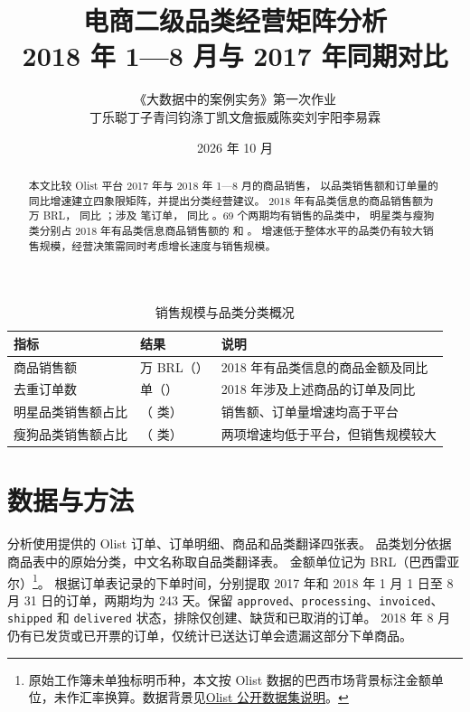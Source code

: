 \documentclass[11pt,a4paper]{ctexart}
\title{\bfseries 电商二级品类经营矩阵分析\\[0.3em]
\large 2018 年 1—8 月与 2017 年同期对比}
\author{《大数据中的案例实务》第一次作业\\[0.35em]
\small 丁乐聪\quad 丁子青\quad 闫钧涤\quad 丁凯文\quad 詹振威\quad 陈奕\quad 刘宇阳\quad 李易霖}
\date{2026 年 10 月}
\begin{document}
\pagestyle{plain}
\maketitle

\begin{abstract}
本文比较 Olist 平台 2017 年与 2018 年 1—8 月的商品销售，
以品类销售额和订单量的同比增速建立四象限矩阵，并提出分类经营建议。
2018 年有品类信息的商品销售额为 \SalesEighteen{} 万 BRL，
同比 \SalesGrowth{}；涉及 \OrdersEighteen{} 笔订单，
同比 \OrderGrowth{}。69 个两期均有销售的品类中，
明星类与瘦狗类分别占 2018 年有品类信息商品销售额的 \StarShare{} 和 \DogShare{}。
增速低于整体水平的品类仍有较大销售规模，经营决策需同时考虑增长速度与销售规模。
\end{abstract}

\begin{table}[H]
\centering
\caption{销售规模与品类分类概况}
\begin{tabular}{p{4.0cm}p{4.5cm}p{6.2cm}}
\toprule
指标 & 结果 & 说明 \\
\midrule
商品销售额 & \SalesEighteen{} 万 BRL（\SalesGrowth{}） & 2018 年有品类信息的商品金额及同比 \\
去重订单数 & \OrdersEighteen{} 单（\OrderGrowth{}） & 2018 年涉及上述商品的订单及同比 \\
明星品类销售额占比 & \StarShare{}（\StarCount{} 类） & 销售额、订单量增速均高于平台 \\
瘦狗品类销售额占比 & \DogShare{}（\DogCount{} 类） & 两项增速均低于平台，但销售规模较大 \\
\bottomrule
\end{tabular}
\end{table}

\section{数据与方法}

分析使用提供的 Olist 订单、订单明细、商品和品类翻译四张表。
品类划分依据商品表中的原始分类，中文名称取自品类翻译表。
金额单位记为 BRL（巴西雷亚尔）\footnote{原始工作簿未单独标明币种，本文按 Olist 数据的巴西市场背景标注金额单位，未作汇率换算。数据背景见\href{https://www.kaggle.com/datasets/olistbr/brazilian-ecommerce}{Olist 公开数据集说明}。}。
根据订单表记录的下单时间，分别提取 2017 年和 2018 年
1 月 1 日至 8 月 31 日的订单，两期均为 243 天。保留
\texttt{approved}、\texttt{processing}、\texttt{invoiced}、
\texttt{shipped} 和 \texttt{delivered} 状态，排除仅创建、缺货和已取消的订单。
2018 年 8 月仍有已发货或已开票的订单，仅统计已送达订单会遗漏这部分下单商品。
\end{document}
